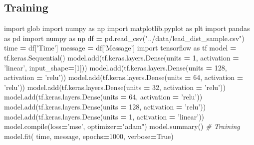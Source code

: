 \documentclass[onecolumn]{article}
\newenvironment{Shaded}{\begin{snugshade}}{\end{snugshade}}
\newcommand{\DecValTok}[1]{\textcolor[rgb]{0.00,0.00,0.81}{#1}}
\newcommand{\StringTok}[1]{\textcolor[rgb]{0.31,0.60,0.02}{#1}}
\newcommand{\ImportTok}[1]{#1}
\newcommand{\CommentTok}[1]{\textcolor[rgb]{0.56,0.35,0.01}{\textit{#1}}}
\newcommand{\VariableTok}[1]{\textcolor[rgb]{0.00,0.00,0.00}{#1}}
\newcommand{\OperatorTok}[1]{\textcolor[rgb]{0.81,0.36,0.00}{\textbf{#1}}}
\newcommand{\BuiltInTok}[1]{#1}
\newcommand{\NormalTok}[1]{#1}
\begin{document}
\subsection{Training}\label{training}

\begin{Shaded}
\begin{Highlighting}[]
\ImportTok{import}\NormalTok{ glob}
\ImportTok{import}\NormalTok{ numpy }\ImportTok{as}\NormalTok{ np}
\ImportTok{import}\NormalTok{ matplotlib.pyplot }\ImportTok{as}\NormalTok{ plt}
\ImportTok{import}\NormalTok{ pandas }\ImportTok{as}\NormalTok{ pd}
\ImportTok{import}\NormalTok{ numpy }\ImportTok{as}\NormalTok{ np}
\NormalTok{df }\OperatorTok{=}\NormalTok{ pd.read_csv(}\StringTok{"../data/lead_dist_sample.csv"}\NormalTok{)}
\NormalTok{time }\OperatorTok{=}\NormalTok{ df[}\StringTok{'Time'}\NormalTok{]}
\NormalTok{message }\OperatorTok{=}\NormalTok{ df[}\StringTok{'Message'}\NormalTok{]}
\ImportTok{import}\NormalTok{ tensorflow }\ImportTok{as}\NormalTok{ tf}
\NormalTok{model }\OperatorTok{=}\NormalTok{ tf.keras.Sequential()}
\NormalTok{model.add(tf.keras.layers.Dense(units }\OperatorTok{=} \DecValTok{1}\NormalTok{, activation }\OperatorTok{=} \StringTok{'linear'}\NormalTok{, input_shape}\OperatorTok{=}\NormalTok{[}\DecValTok{1}\NormalTok{]))}
\NormalTok{model.add(tf.keras.layers.Dense(units }\OperatorTok{=} \DecValTok{128}\NormalTok{, activation }\OperatorTok{=} \StringTok{'relu'}\NormalTok{))}
\NormalTok{model.add(tf.keras.layers.Dense(units }\OperatorTok{=} \DecValTok{64}\NormalTok{, activation }\OperatorTok{=} \StringTok{'relu'}\NormalTok{))}
\NormalTok{model.add(tf.keras.layers.Dense(units }\OperatorTok{=} \DecValTok{32}\NormalTok{, activation }\OperatorTok{=} \StringTok{'relu'}\NormalTok{))}
\NormalTok{model.add(tf.keras.layers.Dense(units }\OperatorTok{=} \DecValTok{64}\NormalTok{, activation }\OperatorTok{=} \StringTok{'relu'}\NormalTok{))}
\NormalTok{model.add(tf.keras.layers.Dense(units }\OperatorTok{=} \DecValTok{128}\NormalTok{, activation }\OperatorTok{=} \StringTok{'relu'}\NormalTok{))}
\NormalTok{model.add(tf.keras.layers.Dense(units }\OperatorTok{=} \DecValTok{1}\NormalTok{, activation }\OperatorTok{=} \StringTok{'linear'}\NormalTok{))}
\NormalTok{model.}\BuiltInTok{compile}\NormalTok{(loss}\OperatorTok{=}\StringTok{'mse'}\NormalTok{, optimizer}\OperatorTok{=}\StringTok{"adam"}\NormalTok{)}
\NormalTok{model.summary()}
\CommentTok{# Training}
\NormalTok{model.fit( time, message, epochs}\OperatorTok{=}\DecValTok{1000}\NormalTok{, verbose}\OperatorTok{=}\VariableTok{True}\NormalTok{)}
\end{Highlighting}
\end{Shaded}
\end{document}
